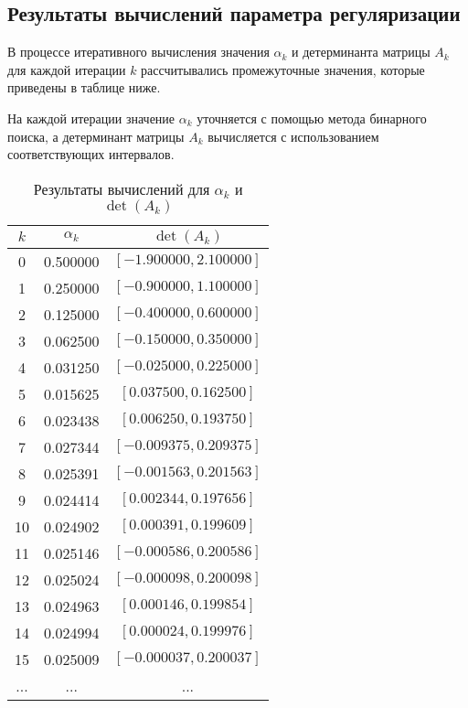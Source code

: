 \documentclass[a4paper,14pt]{article}
\begin{document}
	\subsection{Результаты вычислений параметра регуляризации}

	В процессе итеративного вычисления значения \(\alpha_k\) и детерминанта матрицы \(A_k\) для каждой итерации \(k\) рассчитывались промежуточные значения, которые приведены в таблице ниже. 

	На каждой итерации значение \(\alpha_k\) уточняется с помощью метода бинарного поиска, а детерминант матрицы \(A_k\) вычисляется с использованием соответствующих интервалов.

	\begin{table}[h!]
		\centering
		\begin{tabular}{|c|c|c|}
		\hline
			\textbf{\(k\)} & \textbf{\(\alpha_k\)} & \textbf{\(\det(A_k)\)} \\ \hline
			0 & 0.500000 & \([-1.900000, 2.100000]\) \\ \hline
			1 & 0.250000 & \([-0.900000, 1.100000]\) \\ \hline
			2 & 0.125000 & \([-0.400000, 0.600000]\) \\ \hline
			3 & 0.062500 & \([-0.150000, 0.350000]\) \\ \hline
			4 & 0.031250 & \([-0.025000, 0.225000]\) \\ \hline
			5 & 0.015625 & \([0.037500, 0.162500]\) \\ \hline
			6 & 0.023438 & \([0.006250, 0.193750]\) \\ \hline
			7 & 0.027344 & \([-0.009375, 0.209375]\) \\ \hline
			8 & 0.025391 & \([-0.001563, 0.201563]\) \\ \hline
			9 & 0.024414 & \([0.002344, 0.197656]\) \\ \hline
			10 & 0.024902 & \([0.000391, 0.199609]\) \\ \hline
			11 & 0.025146 & \([-0.000586, 0.200586]\) \\ \hline
			12 & 0.025024 & \([-0.000098, 0.200098]\) \\ \hline
			13 & 0.024963 & \([0.000146, 0.199854]\) \\ \hline
			14 & 0.024994 & \([0.000024, 0.199976]\) \\ \hline
			15 & 0.025009 & \([-0.000037, 0.200037]\) \\ \hline
			... & ... & ... \\ \hline
		\end{tabular}
		\caption{Результаты вычислений для \(\alpha_k\) и \(\det(A_k)\)}
		\label{tab:results}
	\end{table}
\end{document}
